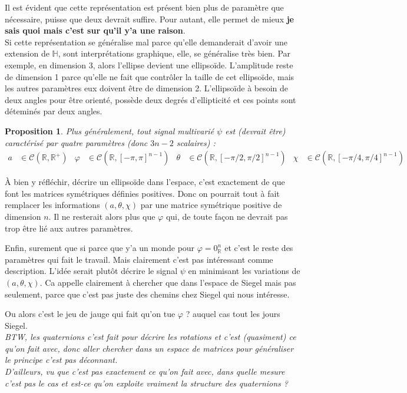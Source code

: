 \documentclass[hidelinks, french, oneside]{article}
\newcommand{\R}{\mathbb{R}}
\theoremstyle{enonce}
\newtheorem{proposition}{Proposition}
\theoremstyle{special}
\theoremstyle{rq}
\theoremstyle{exo}
\theoremstyle{demo}
\begin{document}
Il est évident que cette représentation est présent bien plus de paramètre que nécessaire, puisse que deux devrait suffire. Pour autant, elle permet de mieux \textbf{je sais quoi mais c'est sur qu'il y'a une raison}.
\\
Si cette représentation se généralise mal parce qu'elle demanderait d'avoir une extension de $\mathbb{H}$, sont interprétations graphique, elle, se généralise très bien. Par exemple, en dimension 3, alors l'ellipse devient une ellipsoïde. L'amplitude reste de dimension 1 parce qu'elle ne fait que contrôler la taille de cet ellipsoïde, mais les autres paramètres eux doivent être de dimension 2. L'ellipsoïde à besoin de deux angles pour être orienté, possède deux degrés d'ellipticité et ces points sont déteminés par deux angles.
\\

\begin{proposition}\label{prop:gene_param_signal}
Plus généralement, tout signal multivarié $\psi$ est (\textit{devrait être}) caractérisé par quatre paramètres (donc $3n-2$ scalaires) :
\begin{align*}
	a&\in\mathcal{C}(\R,\R^+)  &  \varphi&\in\mathcal{C}(\R, [-\pi,\pi]^{n-1})  &  \theta&\in\mathcal{C}(\R, [-\pi/2,\pi/2]^{n-1})  &  \chi&\in\mathcal{C}(\R, [-\pi/4,\pi/4]^{n-1})
\end{align*}	
\end{proposition}

\`A bien y réfléchir, décrire un ellipsoïde dans l'espace, c'est exactement de que font les matrices symétriques définies positives. Donc on pourrait tout à fait remplacer les informations $(a,\theta,\chi)$ par une matrice symétrique positive de dimension $n$. Il ne resterait alors plus que $\varphi$ qui, de toute façon ne devrait pas trop être lié aux autres paramètres.

Enfin, surement que si parce que y'a un monde pour $\varphi=0_\R^n$ et c'est le reste des paramètres qui fait le travail. Mais clairement c'est pas intéressant comme description. L'idée serait plutôt décrire le signal $\psi$ en minimisant les variations de $(a,\theta,\chi)$.
Ca appelle clairement à chercher que dans l'espace de Siegel mais pas seulement, parce que c'est pas juste des chemins chez Siegel qui nous intéresse.

Ou alors c'est le jeu de jauge qui fait qu'on tue $\varphi$ ? auquel cas tout les jours Siegel.
\\

\textit{BTW, les quaternions c'est fait pour décrire les rotations et c'est (quasiment) ce qu'on fait avec, donc aller chercher dans un espace de matrices pour généraliser le principe c'est pas déconnant.}
\\
\textit{D'ailleurs, vu que c'est pas exactement ce qu'on fait avec, dans quelle mesure c'est pas le cas et est-ce qu'on exploite vraiment la structure des quaternions ?}
\end{document}
